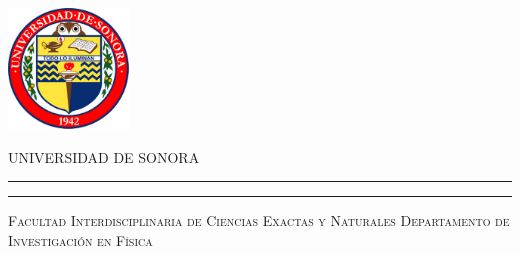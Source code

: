 \thispagestyle{empty} %
%
%
%
%
%
%
%
%
%
%
%
%
%
%
%
%
\begin{minipage}[c][0.15\textheight][c]{0.25\textwidth}
    \begin{center}
        \includegraphics[height=3.2cm, keepaspectratio=true]{unison-logo.png} %
    \end{center}
\end{minipage}
%
%
%
%
%
%
%
%
%
%
%
%
%
%
%
\begin{minipage}[c][0.17\textheight][t]{0.7\textwidth}
    \begin{center}
        {\scshape\LARGE UNIVERSIDAD DE SONORA} %
        \vspace{.5cm}   %
        \hrule height2.5pt  %
        \vspace{.1cm}    %
        \hrule height1pt  %
        \vspace{.4cm}   %
        {\scshape \large Facultad Interdisciplinaria de Ciencias Exactas y Naturales}
        {\scshape Departamento de Investigaci\'on en F\'isica} %
    \end{center}
\end{minipage}
%
%
%
%
%
%
%
%
%
%
%
%
%
%
%
%
%
%
%
%

